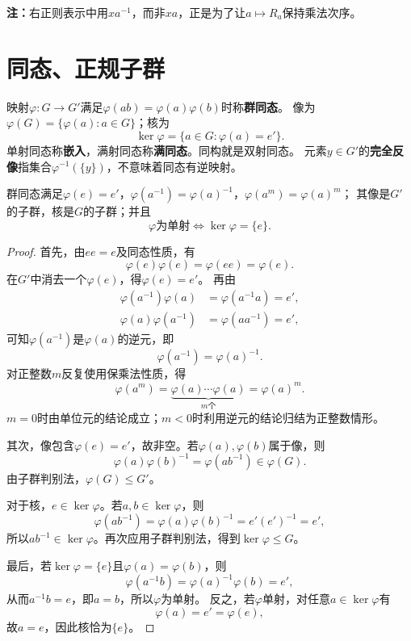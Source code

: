 \textbf{注：}右正则表示中用$xa^{-1}$，而非$xa$，正是为了让$a\mapsto R_a$保持乘法次序。


\section{同态、正规子群}
\begin{definition}
\label{p2:concept:c1-l482}映射$\varphi:G\to G'$满足$\varphi(ab)=\varphi(a)\varphi(b)$时称\textbf{群同态}。
\label{p2:concept:c1-l483}像为$\varphi(G)=\{\varphi(a):a\in G\}$；核为
\[
\ker\varphi=\{a\in G:\varphi(a)=e'\}.
\]
\label{p2:concept:c1-l487}单射同态称\textbf{嵌入}，满射同态称\textbf{满同态}。同构就是双射同态。
\label{p2:concept:c1-l488}元素$y\in G'$的\textbf{完全反像}指集合$\varphi^{-1}(\{y\})$，不意味着同态有逆映射。
\end{definition}

\begin{proposition}
群同态满足$\varphi(e)=e'$，$\varphi(a^{-1})=\varphi(a)^{-1}$，$\varphi(a^m)=\varphi(a)^m$；
其像是$G'$的子群，核是$G$的子群；并且
\[
\varphi\text{为单射}\iff\ker\varphi=\{e\}.
\]
\end{proposition}
\begin{proof}
首先，由$ee=e$及同态性质，有
\[
\varphi(e)\varphi(e)=\varphi(ee)=\varphi(e).
\]
在$G'$中消去一个$\varphi(e)$，得$\varphi(e)=e'$。
再由
\[
\begin{aligned}
\varphi(a^{-1})\varphi(a)&=\varphi(a^{-1}a)=e',\\
\varphi(a)\varphi(a^{-1})&=\varphi(aa^{-1})=e',
\end{aligned}
\]
可知$\varphi(a^{-1})$是$\varphi(a)$的逆元，即
\[
\varphi(a^{-1})=\varphi(a)^{-1}.
\]
对正整数$m$反复使用保乘法性质，得
\[
\varphi(a^m)=\underbrace{\varphi(a)\cdots\varphi(a)}_{m\text{个}}=\varphi(a)^m.
\]
$m=0$时由单位元的结论成立；$m<0$时利用逆元的结论归结为正整数情形。

其次，像包含$\varphi(e)=e'$，故非空。若$\varphi(a),\varphi(b)$属于像，则
\[
\varphi(a)\varphi(b)^{-1}=\varphi(ab^{-1})\in\varphi(G).
\]
由子群判别法，$\varphi(G)\leq G'$。

对于核，$e\in\ker\varphi$。若$a,b\in\ker\varphi$，则
\[
\varphi(ab^{-1})=\varphi(a)\varphi(b)^{-1}=e'(e')^{-1}=e',
\]
所以$ab^{-1}\in\ker\varphi$。再次应用子群判别法，得到$\ker\varphi\leq G$。

最后，若$\ker\varphi=\{e\}$且$\varphi(a)=\varphi(b)$，则
\[
\varphi(a^{-1}b)=\varphi(a)^{-1}\varphi(b)=e',
\]
从而$a^{-1}b=e$，即$a=b$，所以$\varphi$为单射。
反之，若$\varphi$单射，对任意$a\in\ker\varphi$有
\[
\varphi(a)=e'=\varphi(e),
\]
故$a=e$，因此核恰为$\{e\}$。
\end{proof}

